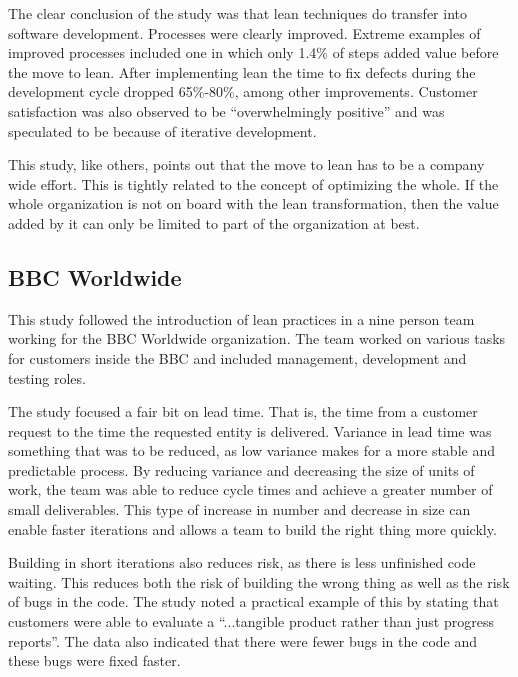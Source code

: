 The clear conclusion of the study was that lean techniques do transfer into software development. Processes were clearly improved. Extreme examples of improved processes included one in which only 1.4\% of steps added value before the move to lean. After implementing lean the time to fix defects during the development cycle dropped 65\%-80\%, among other improvements. Customer satisfaction was also observed to be ``overwhelmingly positive'' and was speculated to be because of iterative development.\cite{Middleton2005Lean}

This study, like others, points out that the move to lean has to be a company wide effort.\cite{Middleton2005Lean} This is tightly related to the concept of optimizing the whole. If the whole organization is not on board with the lean transformation, then the value added by it can only be limited to part of the organization at best.


\subsection{BBC Worldwide}
\label{bbc}

This study followed the introduction of lean practices in a nine person team working for the BBC Worldwide organization. The team worked on various tasks for customers inside the BBC and included management, development and testing roles.\cite{Middleton2012Lean}

The study focused a fair bit on lead time. That is, the time from a customer request to the time the requested entity is delivered. Variance in lead time was something that was to be reduced, as low variance makes for a more stable and predictable process. By reducing variance and decreasing the size of units of work, the team was able to reduce cycle times and achieve a greater number of small deliverables.\cite{Middleton2012Lean} This type of increase in number and decrease in size can enable faster iterations and allows a team to build the right thing more quickly.

Building in short iterations also reduces risk, as there is less unfinished code waiting. This reduces both the risk of building the wrong thing as well as the risk of bugs in the code. The study noted a practical example of this by stating that customers were able to evaluate a ``...tangible product rather than just progress reports''. The data also indicated that there were fewer bugs in the code and these bugs were fixed faster.\cite{Middleton2012Lean}

